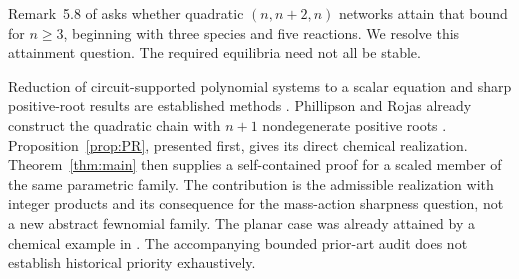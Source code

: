 \documentclass[11pt]{article}
\begin{document}
Remark~5.8 of \cite{BF} asks whether quadratic $(n,n+2,n)$ networks attain that bound for $n\geq3$, beginning with three species and five reactions. We resolve this attainment question. The required equilibria need not all be stable.

Reduction of circuit-supported polynomial systems to a scalar equation and sharp positive-root results are established methods \cite{Bihan,EH,BDF}. Phillipson and Rojas already construct the quadratic chain with $n+1$ nondegenerate positive roots \cite[Theorem 1.6]{PR}. Proposition~\ref{prop:PR}, presented first, gives its direct chemical realization. Theorem~\ref{thm:main} then supplies a self-contained proof for a scaled member of the same parametric family. The contribution is the admissible realization with integer products and its consequence for the mass-action sharpness question, not a new abstract fewnomial family. The planar case was already attained by a chemical example in \cite[Remark 38]{BBH}. The accompanying bounded prior-art audit does not establish historical priority exhaustively.
\end{document}
